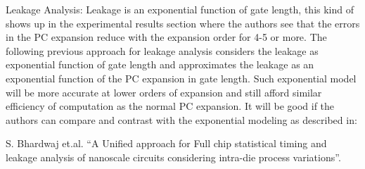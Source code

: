 \begin{reviewer}
Leakage Analysis: Leakage is an exponential function of gate length, this kind of shows up in the experimental results section where the authors see that the errors in the PC expansion reduce with the expansion order for 4-5 or more. The following previous approach for leakage analysis considers the leakage as exponential function of gate length and approximates the leakage as an exponential function of the PC expansion in gate length. Such exponential model will be more accurate at lower orders of expansion and still afford similar efficiency of computation as the normal PC expansion. It will be good if the authors can compare and contrast with the exponential modeling as described in:

S. Bhardwaj et.al. ``A Unified approach for Full chip statistical timing and leakage analysis of nanoscale circuits considering intra-die process variations''.
\end{reviewer}
